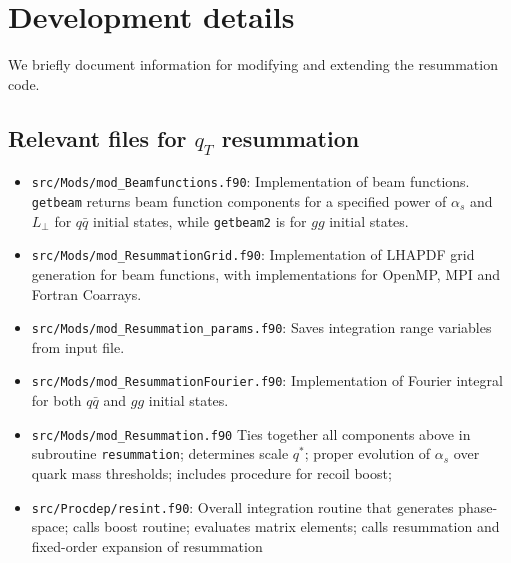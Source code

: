 \documentclass[
  11pt]{scrartcl}
\providecommand{\tightlist}{%
  \setlength{\itemsep}{0pt}\setlength{\parskip}{0pt}}
\begin{document}
\hypertarget{development-details}{%
\section{Development details}\label{development-details}}

We briefly document information for modifying and extending the
resummation code.

\hypertarget{relevant-files-for-q_t-resummation}{%
\subsection{\texorpdfstring{Relevant files for \(q_T\)
resummation}{Relevant files for q\_T resummation}}\label{relevant-files-for-q_t-resummation}}

\begin{itemize}
\tightlist
\item
  \texttt{src/Mods/mod\_Beamfunctions.f90}: Implementation of beam
  functions. \texttt{getbeam} returns beam function components for a
  specified power of \(\alpha_s\) and \(L_\perp\) for \(q\bar{q}\)
  initial states, while \texttt{getbeam2} is for \(gg\) initial states.
\item
  \texttt{src/Mods/mod\_ResummationGrid.f90}: Implementation of LHAPDF
  grid generation for beam functions, with implementations for OpenMP,
  MPI and Fortran Coarrays.
\item
  \texttt{src/Mods/mod\_Resummation\_params.f90}: Saves integration
  range variables from input file.
\item
  \texttt{src/Mods/mod\_ResummationFourier.f90}: Implementation of
  Fourier integral for both \(q\bar{q}\) and \(gg\) initial states.
\item
  \texttt{src/Mods/mod\_Resummation.f90} Ties together all components
  above in subroutine \texttt{resummation}; determines scale \(q^*\);
  proper evolution of \(\alpha_s\) over quark mass thresholds; includes
  procedure for recoil boost;
\item
  \texttt{src/Procdep/resint.f90}: Overall integration routine that
  generates phase-space; calls boost routine; evaluates matrix elements;
  calls resummation and fixed-order expansion of resummation
\end{itemize}
\end{document}
